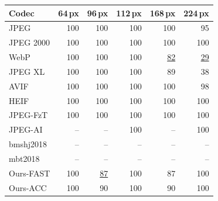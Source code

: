 \begin{tabular}{lrrrrr}
\toprule
Codec & 64\,px & 96\,px & 112\,px & 168\,px & 224\,px \\
\midrule
JPEG & 100 & 100 & 100 & 100 & 95 \\
JPEG 2000 & 100 & 100 & 100 & 100 & 100 \\
WebP & 100 & 100 & 100 & \cellcolor{red!22}\underline{82} & \cellcolor{red!22}\underline{29} \\
JPEG XL & 100 & 100 & 100 & 89 & 38 \\
AVIF & 100 & 100 & 100 & 100 & 98 \\
HEIF & 100 & 100 & 100 & 100 & 100 \\
JPEG-FzT & 100 & 100 & 100 & 100 & 100 \\
JPEG-AI & -- & -- & 100 & -- & 100 \\
bmshj2018 & -- & -- & -- & -- & -- \\
mbt2018 & -- & -- & -- & -- & -- \\
Ours-FAST & 100 & \cellcolor{red!22}\underline{87} & 100 & 87 & 100 \\
Ours-ACC & 100 & 90 & 100 & 90 & 100 \\
\bottomrule
\end{tabular}

